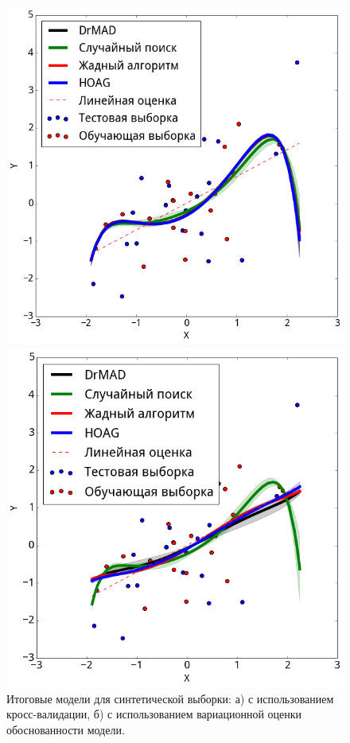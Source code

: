     \begin{figure}
     \begin{minipage}[t]{.5\textwidth}
    
    \includegraphics[width=\linewidth]{plots/hyperparams/poly_cv.png}
    \subcaption{}
    \end{minipage}
     \begin{minipage}[t]{.5\textwidth}
    \includegraphics[width=\linewidth]{plots/hyperparams/poly_var.png}
    \subcaption{}   
\end{minipage}
    
 \caption{Итоговые модели для синтетической выборки: а) с использованием кросс-валидации, б) с использованием вариационной оценки обоснованности модели.}
  \label{fig:poly}
   
    \end{figure}




